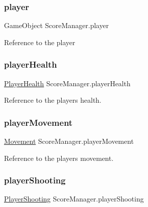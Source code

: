 \subsubsection{\texorpdfstring{player}{player}}
{\footnotesize\ttfamily Game\+Object Score\+Manager.\+player\hspace{0.3cm}{\ttfamily [private]}}

Reference to the player \mbox{\label{class_score_manager_a733e4d30eccc81a124a3602a5e97d964}} 
\subsubsection{\texorpdfstring{playerHealth}{playerHealth}}
{\footnotesize\ttfamily \mbox{\hyperlink{class_player_health}{Player\+Health}} Score\+Manager.\+player\+Health\hspace{0.3cm}{\ttfamily [private]}}

Reference to the player\textquotesingle{}s health. \mbox{\label{class_score_manager_a3ab7ebfe8586d869b79eb6d8ebad99a8}} 
\subsubsection{\texorpdfstring{playerMovement}{playerMovement}}
{\footnotesize\ttfamily \mbox{\hyperlink{class_movement}{Movement}} Score\+Manager.\+player\+Movement\hspace{0.3cm}{\ttfamily [private]}}

Reference to the player\textquotesingle{}s movement. \mbox{\label{class_score_manager_a97abd926be72530ac0c4250271e7ad1f}} 
\subsubsection{\texorpdfstring{playerShooting}{playerShooting}}
{\footnotesize\ttfamily \mbox{\hyperlink{class_player_shooting}{Player\+Shooting}} Score\+Manager.\+player\+Shooting\hspace{0.3cm}{\ttfamily [private]}}

